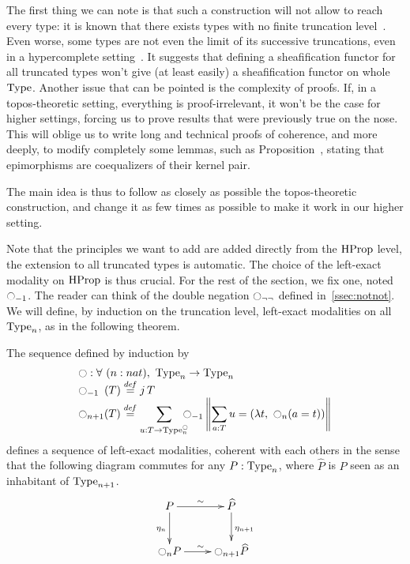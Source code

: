 The first thing we can
note is that such a construction will not allow to reach every type:
it is known that there exists types with no finite truncation
level~\cite[Example 8.8.6]{hottbook}. Even worse, some types are not
even the limit of its successive truncations, even in a hypercomplete
setting~\cite{morelvv}. It suggests that defining a sheafification
functor for all truncated types won't give (at least easily) a
sheafification functor on whole $\operatorname{Type}$.
Another issue that can be pointed is the complexity of proofs. If, in
a topos-theoretic setting, everything is proof-irrelevant, it won't be
the case for higher settings, forcing us to prove results that were
previously true on the nose. This will oblige us to write long and
technical proofs of coherence, and more deeply, to modify completely
some lemmas, such as Proposition~\cite[Theorem IV.7.8]{maclanemoerdijk},
stating that epimorphisms are coequalizers of their kernel pair.

The main idea is thus to follow as closely as possible the
topos-theoretic construction, and change it as few times as possible to
make it work in our higher setting.

Note that the principles we want to add are added directly from the
$\operatorname{HProp}$ level, the extension to all truncated types is automatic. The
choice of the left-exact modality on $\operatorname{HProp}$ is thus crucial. For the
rest of the section, we fix one, noted $\ocircle_{-1}$. The reader can
think of the double negation $\ocircle_{\lnot\lnot}$ defined
in~\ref{ssec:notnot}. We will define, by induction on the truncation
level, left-exact modalities on all $\operatorname{Type}_n$, as in the following
theorem.

\begin{thm}\label{thm:main}
  The sequence defined by induction by
  \[ \begin{array}{l}
   \ocircle : \forall \ (n : nat), \ \operatorname{Type}_n \to \operatorname{Type}_n 
   \\
    \ocircle_{-1\phantom{n}}(T) \overset{de\hspace{-0.2ex}f}{=} \mathop{j} T \\

      \displaystyle{\ensuremath{\ocircle}_{n+1}(T)} \overset{de\hspace{-0.2ex}f}{=}  
      \displaystyle{\sum_{u:T \to \operatorname{Type}_n^{\ensuremath{\ocircle}}} \!\!\!\!\ensuremath{\ocircle}_{-1} 
      \left\|
      \sum_{a:T} u= (\lambda t,~\ensuremath{\ocircle}_n (a=t))
      \right\|}
    \end{array}
\]
defines a sequence of left-exact modalities, coherent with each others
in the sense that the following diagram commutes for any $P:\operatorname{Type}_n$,
where $\hat P$ is $P$ seen as an inhabitant of $\operatorname{Type}_{n+1}$.
\[ \xymatrix{
    P \ar@{->}^{\sim}[r] \ar[d]_{\eta_{n}} & \widehat P \ar[d]^{\eta_{n+1}} \\
    \modal_{n} P \ar@{->}^{\sim}[r] & \modal_{n+1} \widehat P 
  } \]
\end{thm}

